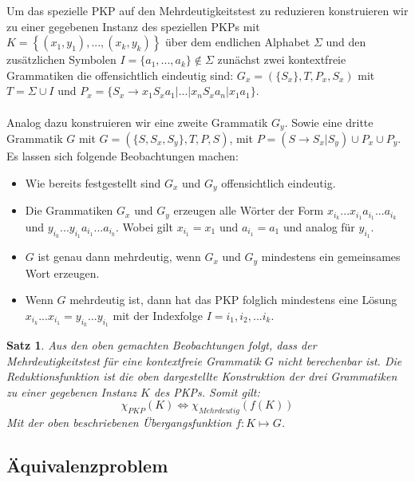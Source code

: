 \documentclass[]{scrartcl}
\newtheorem{satz}[definition]{Satz}
\begin{document}
		Um das spezielle PKP auf den Mehrdeutigkeitstest zu reduzieren konstruieren wir zu einer gegebenen Instanz des speziellen PKPs mit $K = \left\lbrace (x_1, y_1), ..., (x_k, y_k) \right\rbrace$ über dem endlichen Alphabet $\Sigma$ und den zusätzlichen Symbolen $I = \{a_1, ..., a_k\} \notin \Sigma$ zunächst zwei kontextfreie Grammatiken die offensichtlich eindeutig sind:
		\newline\newline
		$G_x = (\{S_x\}, T, P_x, S_x)$ mit $T = \Sigma \cup I$ und $P_x = \{S_x \rightarrow x_1 S_x a_1 | ... | x_n S_x a_n | x_1 a_1\}$.\\ \\
		Analog dazu konstruieren wir eine zweite Grammatik $G_y$. Sowie eine dritte Grammatik $G$ mit \newline\newline
		$G = (\{S, S_x, S_y\}, T, P, S)$, mit $P = (S \rightarrow S_x | S_y) \cup P_x \cup P_y$.\\
		
		Es lassen sich folgende Beobachtungen machen:
		\begin{itemize}
		\item Wie bereits festgestellt sind $G_x$ und $G_y$ offensichtlich eindeutig.
		\item Die Grammatiken $G_x$ und $G_y$ erzeugen alle Wörter der Form $x_{i_k}...x_{i_1}a_{i_1}...a_{i_k}$ und $y_{i_k}...y_{i_1}a_{i_1}...a_{i_k}$. Wobei gilt $x_{i_1} = x_1$ und $a_{i_1} = a_1$ und analog für $y_{i_1}$.
		\item $G$ ist genau dann mehrdeutig, wenn $G_x$ und $G_y$ mindestens ein gemeinsames Wort erzeugen.
		\item Wenn $G$ mehrdeutig ist, dann hat das PKP folglich mindestens eine Lösung $x_{i_k}...x_{i_1} = y_{i_k}...y_{i_1}$ mit der Indexfolge $I = {i_1, i_2, ... i_k}$.
		\end{itemize}
		
		\begin{satz}
		Aus den oben gemachten Beobachtungen folgt, dass der Mehrdeutigkeitstest für eine kontextfreie Grammatik $G$ nicht berechenbar ist. Die Reduktionsfunktion ist die oben dargestellte Konstruktion der drei Grammatiken zu einer gegebenen Instanz $K$ des PKPs. Somit gilt:
		\[\chi_{PKP} (K) \Leftrightarrow \chi_{Mehrdeutig}(f(K))\]
		Mit der oben beschriebenen Übergangsfunktion $f: K \mapsto G$.
		\end{satz}
		

	\subsection{Äquivalenzproblem}
	
\end{document}
